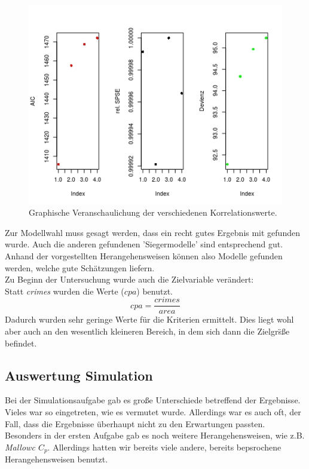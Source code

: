 \begin{figure}
\centering
\includegraphics[scale=1]{./jpgs/wic.jpeg}
\caption{Graphische Veranschaulichung der verschiedenen Korrelationswerte.}
\label{fig:wic}
\end{figure} 
Zur Modellwahl muss gesagt werden, dass ein recht gutes Ergebnis mit  gefunden wurde.
Auch die anderen gefundenen 'Siegermodelle' sind entsprechend gut.
Anhand der vorgestellten Herangehensweisen k\"onnen also Modelle gefunden werden, welche gute Sch\"atzungen liefern. \\
Zu Beginn der Untersuchung wurde auch die Zielvariable ver\"andert: \\
Statt \textit{crimes} wurden die Werte  ($cpa$) benutzt.
\begin{equation}
cpa = \frac{crimes}{area}
\end{equation}
Dadurch wurden sehr geringe Werte f\"ur die Kriterien ermittelt.
Dies liegt wohl aber auch an den wesentlich kleineren Bereich, in dem sich dann die Zielgr\"s\ss{}e befindet.

\subsection{Auswertung Simulation}
Bei der Simulationsaufgabe gab es gro\ss{}e Unterschiede betreffend der Ergebnisse.
Vieles war so eingetreten, wie es vermutet wurde.
Allerdings war es auch oft, der Fall, dass die Ergebnisse \"uberhaupt nicht zu den Erwartungen passten.
\\
Besonders in der ersten Aufgabe gab es noch weitere Herangehensweisen, wie z.B. \textit{Mallowc $C_p$}.
Allerdings hatten wir bereits viele andere, bereits bepsrochene Herangehensweisen benutzt.